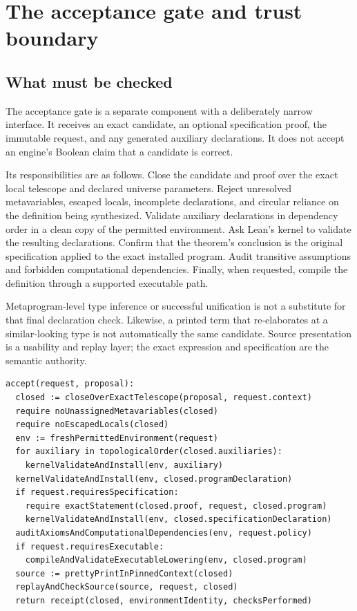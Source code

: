 \documentclass[11pt,letterpaper]{article}
\theoremstyle{definition}
\theoremstyle{remark}
\begin{document}
\section{The acceptance gate and trust boundary}
\label{sec:acceptance}

\subsection{What must be checked}

The acceptance gate is a separate component with a deliberately narrow interface. It receives an exact candidate, an optional specification proof, the immutable request, and any generated auxiliary declarations. It does not accept an engine's Boolean claim that a candidate is correct.

Its responsibilities are as follows. Close the candidate and proof over the exact local telescope and declared universe parameters. Reject unresolved metavariables, escaped locals, incomplete declarations, and circular reliance on the definition being synthesized. Validate auxiliary declarations in dependency order in a clean copy of the permitted environment. Ask Lean's kernel to validate the resulting declarations. Confirm that the theorem's conclusion is the original specification applied to the exact installed program. Audit transitive assumptions and forbidden computational dependencies. Finally, when requested, compile the definition through a supported executable path.

Metaprogram-level type inference or successful unification is not a substitute for that final declaration check. Likewise, a printed term that re-elaborates at a similar-looking type is not automatically the same candidate. Source presentation is a usability and replay layer; the exact expression and specification are the semantic authority.

\Needspace{251pt}
\begin{lstlisting}[caption={Acceptance gate. Pseudocode.}]
accept(request, proposal):
  closed := closeOverExactTelescope(proposal, request.context)
  require noUnassignedMetavariables(closed)
  require noEscapedLocals(closed)
  env := freshPermittedEnvironment(request)
  for auxiliary in topologicalOrder(closed.auxiliaries):
    kernelValidateAndInstall(env, auxiliary)
  kernelValidateAndInstall(env, closed.programDeclaration)
  if request.requiresSpecification:
    require exactStatement(closed.proof, request, closed.program)
    kernelValidateAndInstall(env, closed.specificationDeclaration)
  auditAxiomsAndComputationalDependencies(env, request.policy)
  if request.requiresExecutable:
    compileAndValidateExecutableLowering(env, closed.program)
  source := prettyPrintInPinnedContext(closed)
  replayAndCheckSource(source, request, closed)
  return receipt(closed, environmentIdentity, checksPerformed)
\end{lstlisting}
\end{document}
